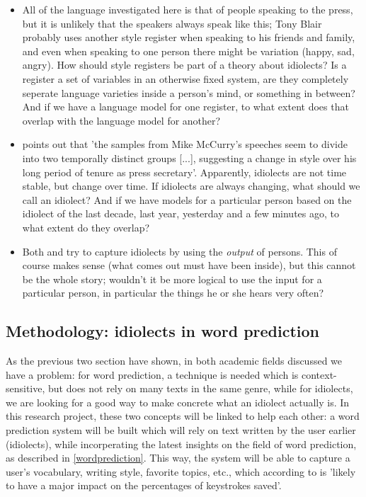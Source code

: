 \documentclass[12pt]{article}
\begin{document}
\begin{itemize}
\item All of the language investigated here is that of people speaking to the press, but it is unlikely that the speakers always speak like this; Tony Blair probably uses another style register when speaking to his friends and family, and even when speaking to one person there might be variation (happy, sad, angry). How should style registers be part of a theory about idiolects? Is a register a set of variables in an otherwise fixed system, are they completely seperate language varieties inside a person's mind, or something in between? And if we have a language model for one register, to what extent does that overlap with the language model for another?
\item {} points out that 'the samples from Mike McCurry's speeches seem to divide into two temporally distinct groups [...], suggesting a change in style over his long period of tenure as press secretary'. Apparently, idiolects are not time stable, but change over time. If idiolects are always changing, what should we call an idiolect? And if we have models for a particular person based on the idiolect of the last decade, last year, yesterday and a few minutes ago, to what extent do they overlap? 
\item Both  and  try to capture idiolects by using the \emph{output} of persons. This of course makes sense (what comes out must have been inside), but this cannot be the whole story; wouldn't it be more logical to use the input for a particular person, in particular the things he or she hears very often?
\end{itemize}

\subsection{Methodology: idiolects in word prediction} \label{link}
As the previous two section have shown, in both academic fields discussed we have a problem: for word prediction, a technique is needed which is context-sensitive, but does not rely on many texts in the same genre, while for idiolects, we are looking for a good way to make concrete what an idiolect actually is. In this research project, these two concepts will be linked to help each other: a word prediction system will be built which will rely on text written by the user earlier (idiolects), while incorperating the latest insights on the field of word prediction, as described in \ref{wordprediction}. This way, the system will be able to capture a user's vocabulary, writing style, favorite topics, etc., which according to  is 'likely to have a major impact on the percentages of keystrokes saved'.
\end{document}
